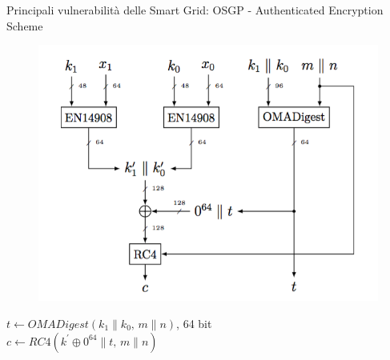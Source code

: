 \begin{frame}{Principali vulnerabilità delle Smart Grid: OSGP - Authenticated Encryption Scheme}
	\begin{figure}[t]
		\includegraphics[scale=0.35,cfbox=blue_slides 1pt 0pt]{imgs/osgp.png}
	\end{figure}
	{$t \gets OMADigest(k_1\|k_0,\,m\|n)$, 64 bit}\\
	{$c \gets RC4(k^{\prime} \oplus 0^{64}\|t,\,m\|n)$}
\end{frame}


